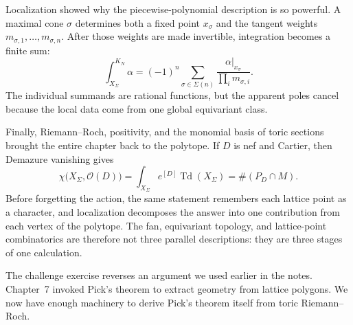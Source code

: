 Localization showed why the piecewise-polynomial description is so
powerful.  A maximal cone \(\sigma\) determines both a fixed point
\(x_\sigma\) and the tangent weights
\(m_{\sigma,1},\ldots,m_{\sigma,n}\).  After those weights are made
invertible, integration becomes a finite sum:
\[
\boxed{
\int_{X_\Sigma}^{K_N}\alpha
=
(-1)^n
\sum_{\sigma\in\Sigma(n)}
\frac{\alpha|_{x_\sigma}}
     {\prod_i m_{\sigma,i}}.
}
\]
The individual summands are rational functions, but the apparent
poles cancel because the local data come from one global equivariant
class.

Finally, Riemann--Roch, positivity, and the monomial basis of toric
sections brought the entire chapter back to the polytope.  If \(D\)
is nef and Cartier, then Demazure vanishing gives
\[
\boxed{
\chi\bigl(X_\Sigma,\mathcal O(D)\bigr)
=
\int_{X_\Sigma}e^{[D]}\operatorname{Td}(X_\Sigma)
=
\#(P_D\cap M).
}
\]
Before forgetting the action, the same statement remembers each
lattice point as a character, and localization decomposes the answer
into one contribution from each vertex of the polytope.  The fan,
equivariant topology, and lattice-point combinatorics are therefore
not three parallel descriptions: they are three stages of one
calculation.

The challenge exercise reverses an argument we used earlier in the
notes.  Chapter~7 invoked Pick's theorem to extract geometry from
lattice polygons.  We now have enough machinery to derive Pick's
theorem itself from toric Riemann--Roch.

